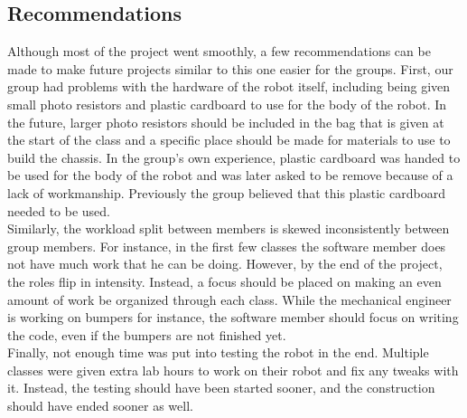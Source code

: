 \documentclass{article}
\begin{document}
\subsection{Recommendations}
Although most of the project went smoothly, a few recommendations can be made to make future projects similar to this one easier for the groups. First, our group had problems with the hardware of the robot itself, including being given small photo resistors and plastic cardboard to use for the body of the robot. In the future, larger photo resistors should be included in the bag that is given at the start of the class and a specific place should be made for materials to use to build the chassis. In the group's own experience, plastic cardboard was handed to be used for the body of the robot and was later asked to be remove because of a lack of workmanship. Previously the group believed that this plastic cardboard needed to be used.\\

Similarly, the workload split between members is skewed inconsistently between group members. For instance, in the first few classes the software member does not have much work that he can be doing. However, by the end of the project, the roles flip in intensity. Instead, a focus should be placed on making an even amount of work be organized through each class. While the mechanical engineer is working on bumpers for instance, the software member should focus on writing the code, even if the bumpers are not finished yet. \\

Finally, not enough time was put into testing the robot in the end. Multiple classes were given extra lab hours to work on their robot and fix any tweaks with it. Instead, the testing should have been started sooner, and the construction should have ended sooner as well. 
\end{document}
